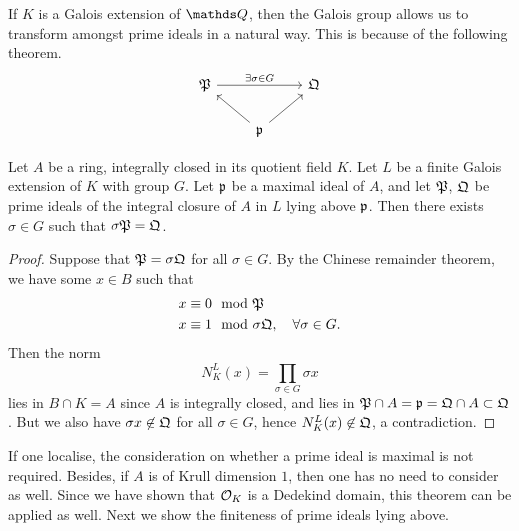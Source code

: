 			If $K$ is a Galois extension of $\Q$, then the Galois group allows us to transform amongst prime ideals in a natural way. This is because of the following theorem.
			\[
				\begin{tikzcd}
					\mathfrak{P} \arrow[rr, "\exists \sigma \in G"] &                                    & \mathfrak{Q} \\
					& \mathfrak{p} \arrow[lu] \arrow[ru] &             
				\end{tikzcd}
			\]
			\begin{theorem}\label{galois-lie-above}
				Let $A$ be a ring, integrally closed in its quotient field $K$. Let $L$ be a finite Galois extension of $K$ with group $G$. Let $\mathfrak{p}$ be a maximal ideal of $A$, and let $\mathfrak{P}$, $\mathfrak{Q}$ be prime ideals of the integral closure of $A$ in $L$ lying above $\mathfrak{p}$. Then there exists $\sigma \in G$ such that $\sigma\mathfrak{P} = \mathfrak{Q}$.
			\end{theorem}
			\begin{proof}
				Suppose that $\mathfrak{P}=\sigma\mathfrak{Q}$ for all $\sigma \in G$. By the Chinese remainder theorem, we have some $x \in B$ such that 
				\[
					\begin{aligned}
						x &\equiv 0 \mod {\mathfrak}{P} \\
						x &\equiv 1 \mod \sigma\mathfrak{Q}, \quad \forall \sigma \in G.
					\end{aligned}
				\]
				Then the norm
				\[
					N_K^L(x) = \prod_{\sigma \in G}\sigma{x}
				\]
				lies in $B \cap K = A$ since $A$ is integrally closed, and lies in $\mathfrak{P} \cap A = \mathfrak{p}=\mathfrak{Q} \cap A \subset \mathfrak{Q}$. But we also have $\sigma{x} \not\in \mathfrak{Q}$ for all $\sigma \in G$, hence $N_K^L(x) \not \in \mathfrak{Q}$, a contradiction.
			\end{proof}
			If one localise, the consideration on whether a prime ideal is maximal is not required. Besides, if $A$ is of Krull dimension $1$, then one has no need to consider as well. Since we have shown that $\mathcal{O}_K$ is a Dedekind domain, this theorem can be applied as well. Next we show the finiteness of prime ideals lying above.
			
